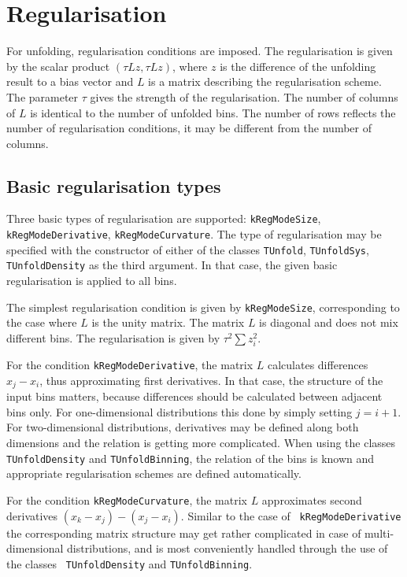 \documentclass[12pt]{article}
\begin{document}
\section{Regularisation}

For unfolding, regularisation conditions are imposed. The
regularisation is given by the scalar product
$\left(\tau Lz,\tau Lz\right)$, where $z$ is the difference of the unfolding
result to a bias vector and $L$ is a matrix describing the
regularisation scheme. The parameter $\tau$ gives the strength of the
regularisation. The number of columns of $L$ is identical to
the number of unfolded bins. The number of rows reflects the number of
regularisation conditions, it may be different from the number of columns.

\subsection{Basic regularisation types}

Three basic types of regularisation are supported: {\tt kRegModeSize},
{\tt kRegModeDerivative}, {\tt kRegModeCurvature}. The type of
regularisation may be specified with the constructor of either of the
classes {\tt TUnfold}, {\tt TUnfoldSys}, {\tt TUnfoldDensity} as the
third argument. In that case, the given basic regularisation is
applied to all bins.

The simplest regularisation condition is given by {\tt kRegModeSize},
corresponding to the case where $L$ is the unity matrix.
The matrix $L$ is diagonal and does not mix different bins. The
regularisation is given by $\tau^2\sum z_i^2$.

For the condition {\tt kRegModeDerivative}, the matrix $L$
calculates differences $x_j-x_i$, thus approximating first
derivatives. In that case, the structure of the input bins matters,
because differences should be calculated between adjacent bins
only. For one-dimensional distributions this done by simply setting
$j=i+1$. For two-dimensional distributions, derivatives may be defined
along both dimensions and the relation is getting more complicated.
When using the classes {\tt TUnfoldDensity} and {\tt TUnfoldBinning},
the relation of the bins is known and appropriate regularisation schemes are
defined automatically.

For the condition {\tt kRegModeCurvature}, the matrix $L$ approximates
second derivatives $(x_k-x_j)-(x_j-x_i)$. Similar to the case of {\tt
  kRegModeDerivative} the corresponding matrix structure may get
rather complicated in case of multi-dimensional distributions, and is
most conveniently handled through the use of the classes {\tt
  TUnfoldDensity} and {\tt TUnfoldBinning}.
\end{document}
